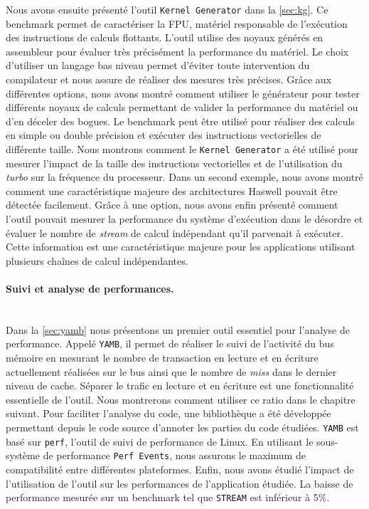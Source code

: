     Nous avons ensuite présenté l'outil \verb|Kernel Generator| dans la \autoref{sec:kg}. Ce benchmark permet de caractériser la FPU, matériel responsable de l'exécution des instructions de calculs flottants. L'outil utilise des noyaux générés en assembleur pour évaluer très précisément la performance du matériel. Le choix d'utiliser un langage bas niveau permet d'éviter toute intervention du compilateur et nous assure de réaliser des mesures très précises. Grâce aux différentes options, nous avons montré comment utiliser le générateur pour tester différents noyaux de calculs permettant de valider la performance du matériel ou d'en déceler des bogues. Le benchmark peut être utilisé pour réaliser des calculs en simple ou double précision et exécuter des instructions vectorielles de différente taille. Nous montrons comment le \verb|Kernel Generator| a été utilisé pour mesurer l'impact de la taille des instructions vectorielles et de l'utilisation du \textit{turbo} sur la fréquence du processeur. Dans un second exemple, nous avons montré comment une caractéristique majeure des architectures Haswell pouvait être détectée facilement. Grâce à une option, nous avons enfin présenté comment l'outil pouvait mesurer la performance du système d'exécution dans le désordre et évaluer le nombre de \textit{stream} de calcul indépendant qu'il parvenait à exécuter. Cette information est une caractéristique majeure pour les applications utilisant plusieurs chaînes de calcul indépendantes.  
    
    

\paragraph{Suivi et analyse de performances.}
~\\
    
    Dans la \autoref{sec:yamb} nous présentons un premier outil essentiel pour l'analyse de performance. Appelé \verb=YAMB=, il permet de réaliser le suivi de l'activité du bus mémoire en mesurant le nombre de transaction en lecture et en écriture actuellement réalisées sur le bus ainsi que le nombre de \textit{miss} dans le dernier niveau de cache. Séparer le trafic en lecture et en écriture est une fonctionnalité essentielle de l'outil. Nous montrerons comment utiliser ce ratio dans le chapitre suivant. Pour faciliter l'analyse du code, une bibliothèque a été développée permettant depuis le code source d'annoter les parties du code étudiées. \verb=YAMB= est basé sur \verb=perf=, l'outil de suivi de performance de Linux. En utilisant le sous-système de performance \verb=Perf Events=, nous assurons le maximum de compatibilité entre différentes plateformes. Enfin, nous avons étudié l'impact de l'utilisation de l'outil sur les performances de l'application étudiée. La baisse de performance mesurée sur un benchmark tel que \verb=STREAM= est inférieur à 5\%.\\
    
